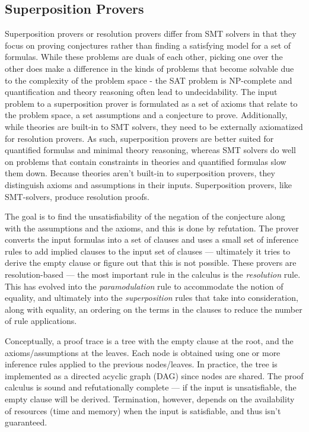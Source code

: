 \documentclass{article}
\begin{document}
	\subsection{Superposition Provers}
	\label{sup}
		Superposition provers or resolution provers differ 
		from SMT solvers in that they focus on proving 
		conjectures rather than finding a satisfying model
		for a set of formulas. While these problems are 
		duals of each other, picking one over the other 
		does make a difference in the kinds of problems 
		that become solvable due to the complexity of 
		the problem space - the SAT problem is NP-complete
		and quantification and theory reasoning often lead 
		to undecidability. The input problem to a 
		superposition prover is formulated as a set of 
		axioms that relate to the problem space, 
		a set assumptions and a conjecture to prove. 
		Additionally, while theories are built-in to SMT 
		solvers, they need to be externally axiomatized 
		for resolution provers. As such, superposition 
		provers are better suited for quantified formulas 
		and minimal theory reasoning, whereas SMT solvers 
		do well on problems that contain constraints 
		in theories and quantified formulas slow them 
		down. Because theories aren't built-in to 
		superposition provers, they distinguish axioms 
		and assumptions in their inputs. Superposition 
		provers, like SMT-solvers, produce resolution 
		proofs.

		The goal is to find the unsatisfiability 
		of the negation of the conjecture along with the 
		assumptions and the axioms, and this is done 
		by refutation. The prover converts 
		the input formulas into a set of clauses and 
		uses a small set of inference rules to add 
		implied clauses to the input set of 
		clauses --- ultimately it tries to derive 
		the empty clause or figure out that this 
		is not possible. These provers are 
		resolution-based --- the most important rule 
		in the calculus is the 
		\textit{resolution} rule. This has evolved 
		into the \textit{paramodulation} rule to 
		accommodate the notion of equality, and 
		ultimately into the \textit{superposition} rules 
		that take into consideration, along with 
		equality, an ordering on the terms in the clauses 
		to reduce the number of rule applications.

		Conceptually, a proof trace is a tree with the 
		empty clause at the root, and the 
		axioms/assumptions at the leaves. Each node is 
		obtained using one or more inference rules applied 
		to the previous nodes/leaves. In practice, the 
		tree is implemented as a directed acyclic graph 
		(DAG) since nodes are shared. The proof calculus 
		is sound and refutationally complete --- if the 
		input is unsatisfiable, the empty clause will be 
		derived. Termination, however, depends on the
		availability of resources (time and memory) when 
		the input is satisfiable, and thus isn't 
		guaranteed. 
\end{document}
